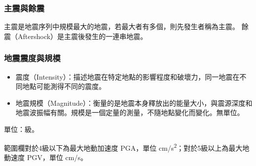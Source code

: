 \documentclass[a4paper,12pt]{report}
\begin{document}
\subsubsection{主震與餘震}
主震是地震序列中規模最大的地震，若最大者有多個，則先發生者稱為主震。 餘震（Aftershock）是主震後發生的一連串地震。
\subsubsection{地震震度與規模}
\begin{itemize}
\item 震度（Intensity）：描述地震在特定地點的影響程度和破壞力，同一地震在不同地點可能測得不同的震度。
\item 地震規模（Magnitude）：衡量的是地震本身釋放出的能量大小，與震源深度和地震波振幅有關。規模是一個定量的測量，不隨地點變化而變化。無單位。
\end{itemize}
單位：級。

範圍欄對於4級以下為最大地動加速度 PGA，單位 cm/s\textsuperscript{2}；對於5級以上為最大地動速度 PGV，單位 cm/s。
\end{document}
